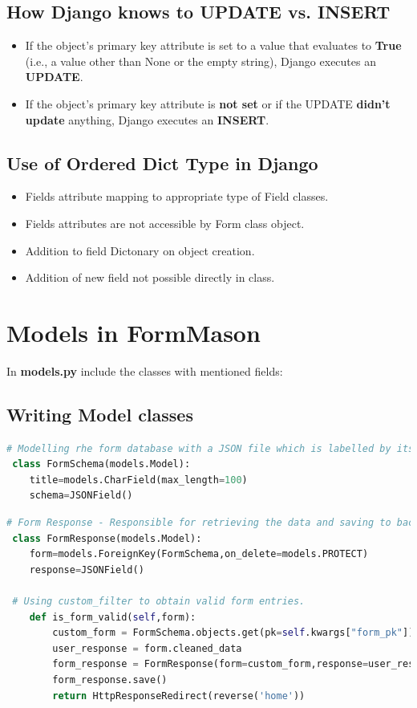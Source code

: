 \subsection{How Django knows to UPDATE vs. INSERT}
\begin{itemize}
	\item If the object's primary key attribute is set to a value that evaluates to \textbf{True} (i.e., a value other than None or the empty string), Django executes an \textbf{UPDATE}.
	\item If the object's primary key attribute is \textbf{not set} or if the UPDATE \textbf{didn't update} anything, Django executes an \textbf{INSERT}.
\end{itemize}
\subsection{Use of Ordered Dict Type in Django}
\begin{itemize}
\item Fields attribute mapping to appropriate type of Field classes.
\item Fields attributes are not accessible by Form class object.
\item Addition to field Dictonary on object creation.
\item Addition of new field not possible directly in class.
\end{itemize}
\newpage
\section{Models in FormMason}
In \textbf{models.py} include the classes with mentioned fields:

\subsection{Writing Model classes}
\begin{lstlisting}[language=python,numbers=none]
 # Modelling rhe form database with a JSON file which is labelled by its title
 class FormSchema(models.Model):
 	title=models.CharField(max_length=100)
 	schema=JSONField()
\end{lstlisting}

\begin{lstlisting}[language=python,numbers=none]
 # Form Response - Responsible for retrieving the data and saving to backstore.
 class FormResponse(models.Model):
 	form=models.ForeignKey(FormSchema,on_delete=models.PROTECT)
 	response=JSONField()
 
 # Using custom_filter to obtain valid form entries.
 	def is_form_valid(self,form):
 		custom_form = FormSchema.objects.get(pk=self.kwargs["form_pk"])
 		user_response = form.cleaned_data
 		form_response = FormResponse(form=custom_form,response=user_response)
 		form_response.save()
 		return HttpResponseRedirect(reverse('home'))
\end{lstlisting}

